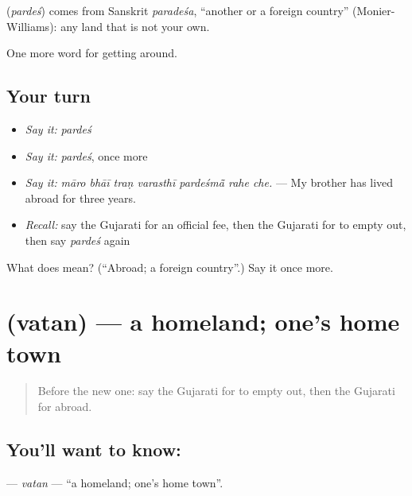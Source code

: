 \begin{cousinweb}
\textbf{} (\emph{pardeś}) comes from Sanskrit \emph{paradeśa}, \textquotedblleft{}another or a foreign country\textquotedblright{} (Monier-Williams): any land that is not your own.
\end{cousinweb}

\begin{grammarlens}[title={What you've built}]
One more word for getting around.
\end{grammarlens}

\subsection*{Your turn}
\begin{itemize}
\raggedright
  \item \emph{Say it:} \emph{pardeś}
  \item \emph{Say it:} \emph{pardeś}, once more
  \item \emph{Say it:} \emph{māro bhāī traṇ varasthī pardeśmā̃ rahe che.} — My brother has lived abroad for three years.
  \item \emph{Recall:} say the Gujarati for an official fee, then the Gujarati for to empty out, then say \emph{pardeś} again
\end{itemize}

\begin{tcolorbox}[breakable,colback=teal!4,colframe=teal!35!black,title={Before you move on}]
What does  mean? (\textquotedblleft{}Abroad; a foreign country\textquotedblright{}.) Say it once more.
\end{tcolorbox}
\section[\texorpdfstring{\gu{વતન} (vatan)}{વતન (vatan)}]{ (vatan) — a homeland; one's home town}

\label{lesson:GU-C407-vatan}



\begin{quote}
Before the new one: say the Gujarati for to empty out, then the Gujarati for abroad.
\end{quote}

\subsection*{You'll want to know: }
\textbf{} — \emph{vatan} — \textquotedblleft{}a homeland; one's home town\textquotedblright{}.

